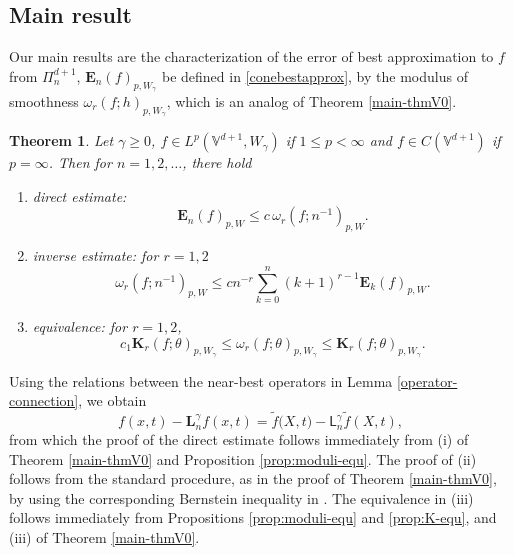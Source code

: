 \documentclass{amsart}
\newtheorem{thm}{Theorem}[section]
\theoremstyle{remark}
\def\g{{\gamma}}
\def\t{{\theta}}
\def\o{{\omega}}
\def\Eb{{\mathbf E}}
\def\Kb{{\mathbf K}}
\def\Lb{{\mathbf L}}
\def\VV{{\mathbb V}}
\def\sL{{\mathsf L}}
\def\g{{\gamma}}
\def\t{{\theta}}
\def\o{{\omega}}
\def\Eb{{\mathbf E}}
\def\Kb{{\mathbf K}}
\def\Lb{{\mathbf L}}
\def\VV{{\mathbb V}}
\newcommand{\wt}{\widetilde}
\begin{document}
\subsection{Main result}
Our main results are the characterization of the error of best approximation to $f$ from 
$\Pi_n^{d+1}$, $\Eb_n(f)_{p, W_\g}$ be defined in \eqref{conebestapprox}, by the modulus of 
smoothness $\o_r(f; h)_{p, W_\g}$, which is an analog of Theorem \ref{main-thmV0}.

\begin{thm}
Let $\g \ge 0$, $f \in L^p(\VV^{d+1}, W_\g)$ if $1 \le p < \infty$ and $f\in C(\VV^{d+1})$ if $p = \infty$. 
Then for   $n =1,2,\ldots$, there hold 
\begin{enumerate} [ \rm  (i)]
\item direct estimate: 
$$
    \Eb_n(f)_{p,W} \le c \, \o_r(f;n^{-1})_{p,W}.
$$
\item inverse estimate:  for $r=1, 2$
$$
	\o_r(f;n^{-1})_{p,W} \le c n^{-r} \sum_{k=0}^n (k+1)^{r-1}\Eb_k(f)_{p, W}.
$$
\item equivalence:  for $r=1,2$,
$$
c_1 \Kb_r(f; \t)_{p,W_\g } \le \o_r(f;\t)_{p,W_\g} \leq  \Kb_r(f;\t)_{p,W_\g}.
$$
\end{enumerate}
\end{thm}
 
Using the relations between the near-best operators in Lemma \eqref{operator-connection}, we obtain 
$$
   f(x,t) -  \Lb^\g_nf(x,t) = \wt f\big( X,t) - \sL^\g_n\tilde{f} (X,t),
$$
from which the proof of the direct estimate follows immediately from (i) of Theorem \ref{main-thmV0} and 
Proposition \ref{prop:moduli-equ}. The proof of (ii) follows from the standard procedure, as in the proof
of Theorem \ref{main-thmV0}, by using the corresponding Bernstein inequality in \cite{X23}. The 
equivalence in (iii) follows immediately from Propositions \ref{prop:moduli-equ} and \ref{prop:K-equ},  
and (iii) of Theorem \ref{main-thmV0}. 
\end{document}
